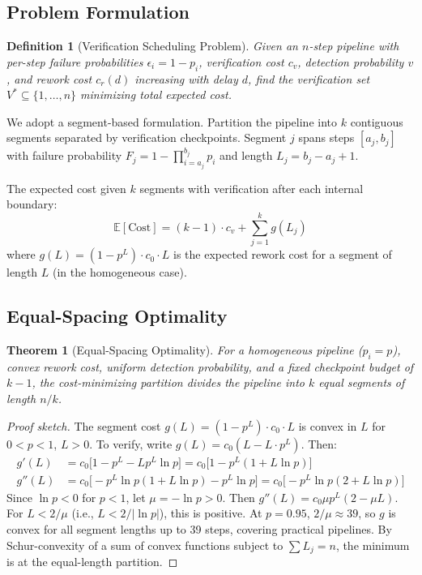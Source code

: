\documentclass[11pt, a4paper, logo, copyright]{googledeepmind}
\newtheorem{definition}{Definition}[section]
\newtheorem{theorem}{Theorem}[section]
\newcommand{\E}{\mathbb{E}}
\begin{document}
\subsection{Problem Formulation}

\begin{definition}[Verification Scheduling Problem]
Given an $n$-step pipeline with per-step failure probabilities $\epsilon_i = 1 - p_i$, verification cost $c_v$, detection probability $v$, and rework cost $c_r(d)$ increasing with delay $d$, find the verification set $V^* \subseteq \{1, \ldots, n\}$ minimizing total expected cost.
\end{definition}

We adopt a segment-based formulation.
Partition the pipeline into $k$ contiguous segments separated by verification checkpoints.
Segment $j$ spans steps $[a_j, b_j]$ with failure probability $F_j = 1 - \prod_{i=a_j}^{b_j} p_i$ and length $L_j = b_j - a_j + 1$.

The expected cost given $k$ segments with verification after each internal boundary:
\begin{equation}
\E[\text{Cost}] = (k-1) \cdot c_v + \sum_{j=1}^{k} g(L_j)
\end{equation}
where $g(L) = (1 - p^L) \cdot c_0 \cdot L$ is the expected rework cost for a segment of length $L$ (in the homogeneous case).

\subsection{Equal-Spacing Optimality}

\begin{theorem}[Equal-Spacing Optimality]
\label{thm:equalspacing}
For a homogeneous pipeline ($p_i = p$), convex rework cost, uniform detection probability, and a fixed checkpoint budget of $k-1$, the cost-minimizing partition divides the pipeline into $k$ equal segments of length $n/k$.
\end{theorem}

\begin{proof}[Proof sketch]
The segment cost $g(L) = (1 - p^L) \cdot c_0 \cdot L$ is convex in $L$ for $0 < p < 1$, $L > 0$.
To verify, write $g(L) = c_0(L - L \cdot p^L)$. Then:
\begin{align*}
g'(L) &= c_0\bigl[1 - p^L - L p^L \ln p\bigr] = c_0\bigl[1 - p^L(1 + L\ln p)\bigr]\\
g''(L) &= c_0\bigl[-p^L \ln p(1 + L\ln p) - p^L \ln p\bigr] = c_0\bigl[-p^L \ln p(2 + L\ln p)\bigr]
\end{align*}
Since $\ln p < 0$ for $p < 1$, let $\mu = -\ln p > 0$. Then $g''(L) = c_0 \mu p^L(2 - \mu L)$.
For $L < 2/\mu$ (i.e., $L < 2/|\ln p|$), this is positive.
At $p = 0.95$, $2/\mu \approx 39$, so $g$ is convex for all segment lengths up to 39 steps, covering practical pipelines.
By Schur-convexity of a sum of convex functions subject to $\sum L_j = n$, the minimum is at the equal-length partition.
\end{proof}
\end{document}
